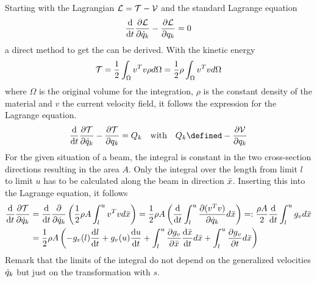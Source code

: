 Starting with the Lagrangian ${\cal{L}} = {\cal{T}} - {\cal{V}}$ and the standard Lagrange equation
%
\begin{align*}
  \frac{\mathrm{d} }{\mathrm{d} t} \frac{\partial {\ensuremath{{\cal{L}}}}}{\partial {\dot{q}_k}} - \frac{\partial {\ensuremath{{\cal{L}}}}}{\partial {q_k}} = 0
\end{align*}
%
a direct method to get the \eom can be derived.
With the kinetic energy 
%
\begin{align}
  \label{eq:General_Kinetic_Energy}
  {\cal{T}} = \frac{1}{2} \int_\Omega v^T v \rho d \Omega = \frac{1}{2} \rho \int_\Omega v^Tv d\Omega
\end{align}
%
where $\Omega$ is the original volume for the integration, $\rho$ is the constant density of the material and $v$ the current velocity field, it follows the expression for the Lagrange equation.
%
\begin{align}
  \label{eq:Lagrange_Equation}
  \ddt{} \pd{\calT}{\dotqk} - \pd{\calT}{q_k} = Q _{k} \quad \text{with} \quad Q_k \defined - \frac{\partial \calV}{\partial q_k} 
\end{align}
%
For the given situation of a beam, the integral is constant in the two cross-section directions resulting in the area $A$.
Only the integral over the length from limit $l$ to limit $u$ has to be calculated along the beam in direction $\bar{x}$.
%
%
Inserting this into the Lagrange equation, it follows
%
\begin{align}
  \frac{\mathrm{d} }{\mathrm{d} t} \frac{\partial {\ensuremath{{\cal{T}}}}}{\partial {\dot{q}_k}} &= \frac{\mathrm{d} }{\mathrm{d} t} \frac{\partial {}}{\partial {\dot{q}_k}} \left( \frac{1}{2} \rho A \int _{l} ^{u} v^Tv d\bar{x} \right) 
  = \frac{1}{2} \rho A  \left( \frac{\mathrm{d} }{\mathrm{d} t} \int _{l} ^{u} \frac{\partial {(v^Tv)}}{\partial {\dot{q}_k}} d\bar{x} \right) 
  =: \frac{\rho A}{2}  \frac{\mathrm{d} }{\mathrm{d} t} \int _{l} ^{u} g_v d\bar{x} \nonumber  \\ 
  \label{eq:DerivativeOfKineticEnergyWithVariableBoundaries} 
  &= \frac{1}{2} \rho A \left( -g_v(l) \frac{\mathrm{d} l}{\mathrm{d} t} + g_v(u) \frac{\mathrm{d} u}{\mathrm{d} t} +  \int _{l} ^{u} \frac{\partial {g_v}}{\partial {\bar{x}}} \frac{\mathrm{d} \bar{x}}{\mathrm{d} t} d \bar{x} + \int _{l} ^{u} \frac{\partial {g_v}}{\partial {t}} d \bar{x} \right)
\end{align}
%
Remark that the limits of the integral do not depend on the generalized velocities $\dot{q}_k$ but just on the transformation with $s$.\\



